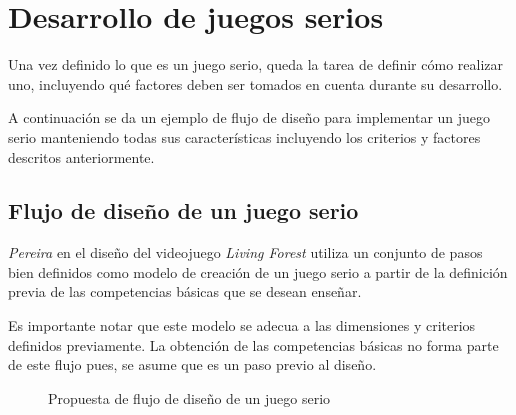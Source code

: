 \section{Desarrollo de juegos serios}
\label{sec:desarrollo}

Una vez definido lo que es un juego serio, queda la tarea de definir cómo
realizar uno, incluyendo qué factores deben ser tomados en cuenta durante su
desarrollo.

A continuación se da un ejemplo de flujo de diseño para implementar un juego serio 
manteniendo todas sus características incluyendo los criterios y factores descritos 
anteriormente.

\subsection{Flujo de diseño de un juego serio}

\textit{Pereira}\cite{pereira2009design} en el diseño del videojuego \emph{Living
    Forest} utiliza un conjunto de pasos bien definidos como modelo de creación
de un juego serio a partir de la definición previa de las competencias básicas
que se desean enseñar.

Es importante notar que este modelo se adecua a las dimensiones y criterios
definidos previamente. La obtención de las competencias básicas no forma parte
de este flujo pues, se asume que es un paso previo al diseño.

\begin{figure}[ht!]
\centering
{}
\caption{Propuesta de flujo de diseño de un juego serio}
\label{fig:tics_flujo_diseño_prop}
\end{figure}

